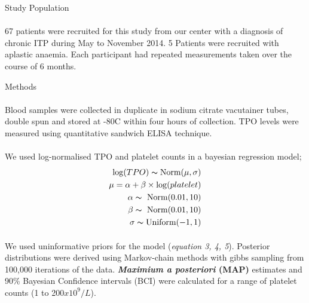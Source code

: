 \documentclass[landscape,a0paper,fontscale=0.285]{beamer} %
\newlength{\onecolwid}
\begin{document}
\begin{frame}[t]
\begin{columns}[t]
\begin{column}{\onecolwid}
\begin{block}{Study Population}
\paragraph{} 67 patients were recruited for this study from our center with a diagnosis of chronic ITP during May to November 2014. 5 Patients were recruited with aplastic anaemia. Each participant had repeated measurements taken over the course of 6 months.  



\end{block}

\begin{block}{Methods}
\paragraph{}Blood samples were collected in duplicate in sodium citrate vacutainer tubes, double spun and stored at -80\textdegree C within four hours of collection. TPO levels were measured using quantitative sandwich ELISA technique.
\paragraph{} We used log-normalised TPO and platelet counts in a bayesian regression model;
\begin{align}
    \log(TPO) \thicksim \text{Norm}(\mu, \sigma) \\
    \mu = \alpha + \beta\times \log(platelet) \\
    \alpha \thicksim\ \text{Norm}(0.01, 10) \\
    \beta \thicksim\ \text{Norm}(0.01, 10) \\
    \sigma \thicksim \text{Uniform}(-1, 1)
\end{align}
\paragraph{} We used uninformative priors for the model (\textit{equation 3, 4, 5}). Posterior distributions were derived using Markov-chain methods with gibbs sampling from 100,000 iterations of the data. \textbf{\textit{Maximium a posteriori} (MAP)} estimates and 90\% Bayesian Confidence intervals (BCI) were calculated for a range of platelet counts (1 to 200$x10^9/L$). 
\end{block}



\end{column}
\end{columns}
\end{frame}
\end{document}
